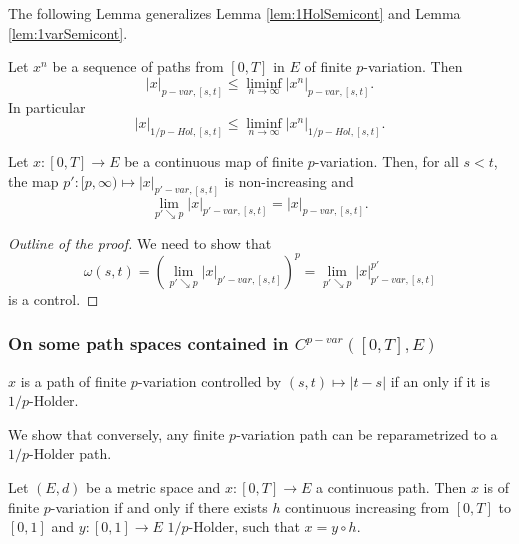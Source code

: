 The following Lemma generalizes Lemma \ref{lem:1HolSemicont} and Lemma \ref{lem:1varSemicont}.

\begin{lemma}
    Let $x^n$ be a sequence of paths from $[0,T]$ in $E$ of finite $p$-variation. Then
    \begin{equation}
        |x|_{p-var,[s,t]} \leq \liminf_{n \rightarrow \infty} |x^n|_{p-var, [s,t]}.
    \end{equation}
    In particular 
    \begin{equation}
        |x|_{1/p-Hol,[s,t]} \leq \liminf_{n \rightarrow \infty} |x^n|_{1/p-Hol, [s,t]}.
    \end{equation}
\end{lemma}

\begin{lemma}
    Let $x:[0,T] \rightarrow E$ be a continuous map of finite $p$-variation. Then, for all $s < t$, the map $p':[p,\infty) \mapsto |x|_{p'-var,[s,t]}$ is non-increasing and 
    \begin{equation}
        \lim_{p' \searrow p} |x|_{p'-var, [s,t]} = |x|_{p-var, [s,t]}.
    \end{equation}
\end{lemma}
\begin{proof}[Outline of the proof]
    We need to show that 
    \begin{equation}
    \omega(s,t) = \left( \lim_{p' \searrow p} |x|_{p'-var, [s,t]} \right)^p = \lim_{p' \searrow p} |x|_{p'-var, [s,t]}^{p'}
    \end{equation}
    is a control.
\end{proof}

\subsubsection{On some path spaces contained in $C^{p-var}([0,T], E)$}

\begin{observation}
    $x$ is a path of finite $p$-variation controlled by $(s,t) \mapsto |t - s|$ if an only if it is $1/p$-Holder.
\end{observation}

We show that conversely, any finite $p$-variation path can be reparametrized to a $1/p$-Holder path.

\begin{proposition}
    Let $(E,d)$ be a metric space and $x:[0,T] \rightarrow E$ a continuous path.
    Then $x$ is of finite $p$-variation if and only if there exists $h$ continuous increasing from $[0,T]$ to $[0,1]$ and $y:[0,1]\rightarrow E$ $1/p$-Holder, such that $x = y \circ h.$
\end{proposition}

